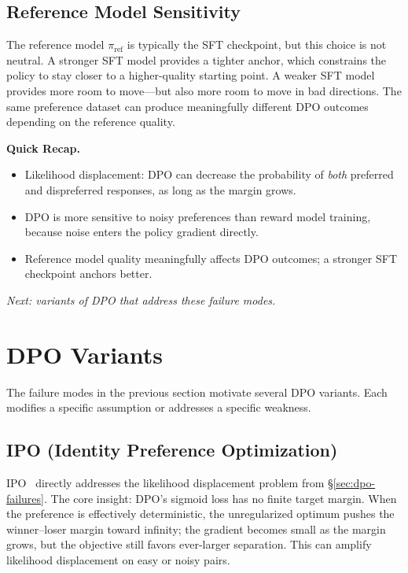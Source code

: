 \subsection{Reference Model Sensitivity}

The reference model $\pi_{\text{ref}}$ is typically the SFT checkpoint, but this choice is not neutral. A stronger SFT model provides a tighter anchor, which constrains the policy to stay closer to a higher-quality starting point. A weaker SFT model provides more room to move---but also more room to move in bad directions. The same preference dataset can produce meaningfully different DPO outcomes depending on the reference quality.

\begin{quickrecap}
\textbf{Quick Recap.}
\begin{itemize}[nosep,leftmargin=1.5em]
  \item Likelihood displacement: DPO can decrease the probability of \emph{both} preferred and dispreferred responses, as long as the margin grows.
  \item DPO is more sensitive to noisy preferences than reward model training, because noise enters the policy gradient directly.
  \item Reference model quality meaningfully affects DPO outcomes; a stronger SFT checkpoint anchors better.
\end{itemize}
\textit{Next: variants of DPO that address these failure modes.}
\end{quickrecap}


\section{DPO Variants}
\label{sec:dpo-variants}

The failure modes in the previous section motivate several DPO variants. Each modifies a specific assumption or addresses a specific weakness.

\subsection{IPO (Identity Preference Optimization)}

IPO~\cite{azar2024ipo} directly addresses the likelihood displacement problem from \S\ref{sec:dpo-failures}. The core insight: DPO's sigmoid loss has no finite target margin. When the preference is effectively deterministic, the unregularized optimum pushes the winner--loser margin toward infinity; the gradient becomes small as the margin grows, but the objective still favors ever-larger separation. This can amplify likelihood displacement on easy or noisy pairs.

